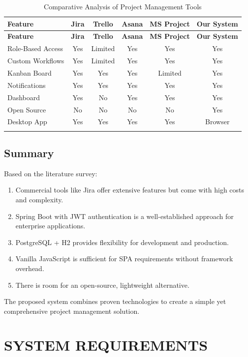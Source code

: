 \documentclass[12pt,a4paper,twoside]{book}
\begin{document}
\begin{longtable}{|l|c|c|c|c|c|}
\hline
\textbf{Feature} & \textbf{Jira} & \textbf{Trello} & \textbf{Asana} & \textbf{MS Project} & \textbf{Our System} \\ \hline
\endfirsthead
\hline
\textbf{Feature} & \textbf{Jira} & \textbf{Trello} & \textbf{Asana} & \textbf{MS Project} & \textbf{Our System} \\ \hline
\endhead
Role-Based Access & Yes & Limited & Yes & Yes & Yes \\ \hline
Custom Workflows & Yes & Limited & Yes & Yes & Yes \\ \hline
Kanban Board & Yes & Yes & Yes & Limited & Yes \\ \hline
Notifications & Yes & Yes & Yes & Yes & Yes \\ \hline
Dashboard & Yes & No & Yes & Yes & Yes \\ \hline
Open Source & No & No & No & No & Yes \\ \hline
Desktop App & Yes & Yes & Yes & Yes & Browser \\ \hline
\caption{Comparative Analysis of Project Management Tools}
\end{longtable}

\section{Summary}

Based on the literature survey:

\begin{enumerate}
    \item Commercial tools like Jira offer extensive features but come with high costs and complexity.
    \item Spring Boot with JWT authentication is a well-established approach for enterprise applications.
    \item PostgreSQL + H2 provides flexibility for development and production.
    \item Vanilla JavaScript is sufficient for SPA requirements without framework overhead.
    \item There is room for an open-source, lightweight alternative.
\end{enumerate}

The proposed system combines proven technologies to create a simple yet comprehensive project management solution.

\chapter{SYSTEM REQUIREMENTS}
\end{document}
